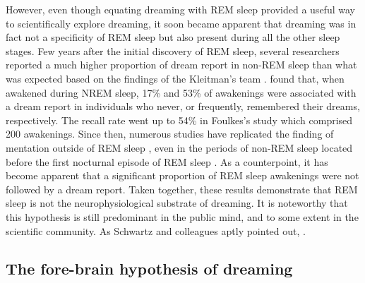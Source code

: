 However, even though equating dreaming with REM sleep provided a useful way to scientifically explore dreaming, it soon became apparent that dreaming was in fact not a specificity of REM sleep but also present during all the other sleep stages. Few years after the initial discovery of REM sleep, several researchers reported a much higher proportion of dream report in non-REM sleep than what was expected based on the findings of the Kleitman’s team \citep{goodenough_comparison_1959, foulkes_dream_1962}. \citet{goodenough_comparison_1959} found that, when awakened during NREM sleep, 17\% and 53\% of awakenings were associated with a dream report in individuals who never, or frequently, remembered their dreams, respectively. The recall rate went up to 54\% in Foulkes’s study which comprised 200 awakenings. Since then, numerous studies have replicated the finding of mentation outside of REM sleep \citep{nielsen_review_2000}, even in the periods of non-REM sleep located before the first nocturnal episode of REM sleep \citep{noreika_early-night_2009}. As a counterpoint, it has become apparent that a significant proportion of REM sleep awakenings were not followed by a dream report. Taken together, these results demonstrate that REM sleep is not the neurophysiological substrate of dreaming. It is noteworthy that this hypothesis is still predominant in the public mind, and to some extent in the scientific community. As Schwartz and colleagues aptly pointed out,  \citep{schwartz_dreaming:_2005}.

\subsection{The fore-brain hypothesis of dreaming}
\label{sec:dream-research:link:solms}

